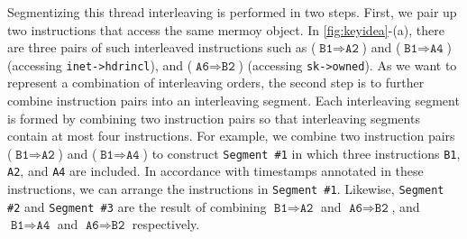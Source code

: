 Segmentizing this thread interleaving is performed in two steps.
%
First, we pair up two instructions that access the same mermoy object.
%
In \autoref{fig:keyidea}-(a), there are three pairs of such
interleaved instructions such as
($\texttt{B1} \Rightarrow \texttt{A2}$) and
($\texttt{B1} \Rightarrow \texttt{A4}$) (accessing
\texttt{inet->hdrincl}), and ($\texttt{A6} \Rightarrow \texttt{B2}$)
(accessing \texttt{sk->owned}).
%
As we want to represent a combination of interleaving orders, the
second step is to further combine instruction pairs into an
interleaving segment.
%
Each interleaving segment is formed by combining two instruction pairs
so that interleaving segments contain at most four instructions.
%
For example, we combine two instruction pairs
($\texttt{B1} \Rightarrow \texttt{A2}$) and
($\texttt{B1} \Rightarrow \texttt{A4}$) to construct \texttt{Segment
  \#1} in which three instructions \texttt{B1}, \texttt{A2}, and
\texttt{A4} are included.
%
In accordance with timestamps annotated in these instructions, we can
arrange the instructions in \texttt{Segment \#1}.
%
Likewise, \texttt{Segment \#2} and \texttt{Segment \#3} are the result
of combining $\texttt{B1} \Rightarrow \texttt{A2}$ and
$\texttt{A6} \Rightarrow \texttt{B2}$, and
$\texttt{B1} \Rightarrow \texttt{A4}$ and
$\texttt{A6} \Rightarrow \texttt{B2}$ respectively.

%
%




